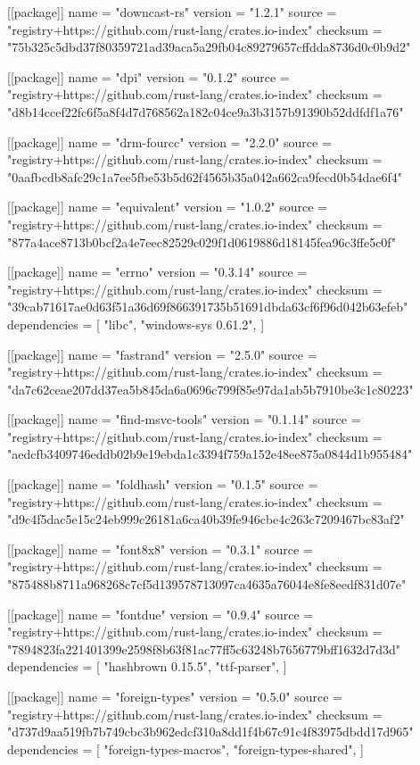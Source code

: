 [[package]]
name = "downcast-rs"
version = "1.2.1"
source = "registry+https://github.com/rust-lang/crates.io-index"
checksum = "75b325c5dbd37f80359721ad39aca5a29fb04c89279657cffdda8736d0c0b9d2"

[[package]]
name = "dpi"
version = "0.1.2"
source = "registry+https://github.com/rust-lang/crates.io-index"
checksum = "d8b14ccef22fc6f5a8f4d7d768562a182c04ce9a3b3157b91390b52ddfdf1a76"

[[package]]
name = "drm-fourcc"
version = "2.2.0"
source = "registry+https://github.com/rust-lang/crates.io-index"
checksum = "0aafbcdb8afc29c1a7ee5fbe53b5d62f4565b35a042a662ca9fecd0b54dae6f4"

[[package]]
name = "equivalent"
version = "1.0.2"
source = "registry+https://github.com/rust-lang/crates.io-index"
checksum = "877a4ace8713b0bcf2a4e7eec82529c029f1d0619886d18145fea96c3ffe5c0f"

[[package]]
name = "errno"
version = "0.3.14"
source = "registry+https://github.com/rust-lang/crates.io-index"
checksum = "39cab71617ae0d63f51a36d69f866391735b51691dbda63cf6f96d042b63efeb"
dependencies = [
 "libc",
 "windows-sys 0.61.2",
]

[[package]]
name = "fastrand"
version = "2.5.0"
source = "registry+https://github.com/rust-lang/crates.io-index"
checksum = "da7c62ceae207dd37ea5b845da6a0696c799f85e97da1ab5b7910be3c1c80223"

[[package]]
name = "find-msvc-tools"
version = "0.1.14"
source = "registry+https://github.com/rust-lang/crates.io-index"
checksum = "aedcfb3409746eddb02b9e19ebda1c3394f759a152e48ee875a0844d1b955484"

[[package]]
name = "foldhash"
version = "0.1.5"
source = "registry+https://github.com/rust-lang/crates.io-index"
checksum = "d9c4f5dac5e15c24eb999c26181a6ca40b39fe946cbe4c263c7209467bc83af2"

[[package]]
name = "font8x8"
version = "0.3.1"
source = "registry+https://github.com/rust-lang/crates.io-index"
checksum = "875488b8711a968268c7cf5d139578713097ca4635a76044e8fe8eedf831d07e"

[[package]]
name = "fontdue"
version = "0.9.4"
source = "registry+https://github.com/rust-lang/crates.io-index"
checksum = "7894823fa221401399e2598f8b63f81ac77ff5c63248b7656779bff1632d7d3d"
dependencies = [
 "hashbrown 0.15.5",
 "ttf-parser",
]

[[package]]
name = "foreign-types"
version = "0.5.0"
source = "registry+https://github.com/rust-lang/crates.io-index"
checksum = "d737d9aa519fb7b749cbc3b962edcf310a8dd1f4b67c91c4f83975dbdd17d965"
dependencies = [
 "foreign-types-macros",
 "foreign-types-shared",
]


